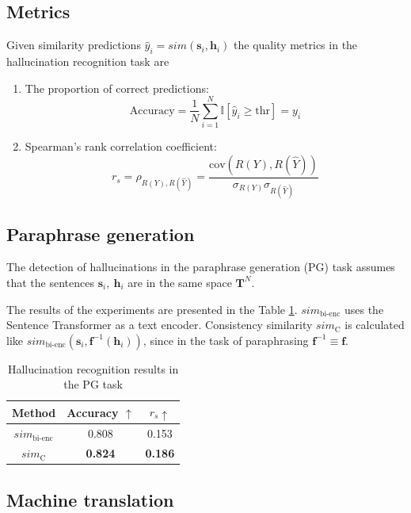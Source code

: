 \documentclass[11pt]{article}
\begin{document}
\subsection{Metrics}

Given similarity predictions $\hat{y}_i = sim(\mathbf{s}_i, \mathbf{h}_i)$ the quality metrics in the hallucination recognition task are 

\begin{enumerate}
    \item The proportion of correct predictions:
    \[\text{Accuracy} = \frac1N \sum\limits_{i=1}^N \mathbb{I}[\hat{y}_i \ge \text{thr}] = y_i\]
    \item Spearman's rank correlation coefficient:
    \[r_s= \rho_{R(Y), R(\hat{Y})} = \frac{\text{cov} (R(Y), R(\hat{Y}))}{\sigma_{R(Y)} \sigma_{R(\hat{Y})}}\]
\end{enumerate}

\subsection{Paraphrase generation}

The detection of hallucinations in the paraphrase generation (PG) task assumes that the sentences $\mathbf{s}_i,~\mathbf{h}_i$ are in the same space $\mathbf{T}^{N}$. 

The results of the experiments are presented in the Table \ref{tab:pg}. $sim_\text{bi-enc}$ uses the Sentence Transformer \cite{reimers-gurevych-2019-sentence} as a text encoder. Consistency similarity $sim_\text{C}$ is calculated like $sim_\text{bi-enc} (\mathbf{s}_i, \mathbf{f}^{-1} (\mathbf{h}_i))$, since in the task of paraphrasing $\mathbf{f}^{-1} \equiv \mathbf{f}$.

\begin{table}[]
    \centering
    \begin{tabular}{c|c c}
    Method & Accuracy $\uparrow$ & $r_s \uparrow$ \\
    \hline
    $sim_\text{bi-enc}$ & 0.808 & 0.153 \\
    $sim_\text{C}$ & \textbf{0.824} & \textbf{0.186} \\
    \end{tabular}
    \caption{Hallucination recognition results in the PG task}
    \label{tab:pg}
\end{table}

\subsection{Machine translation}
\end{document}
